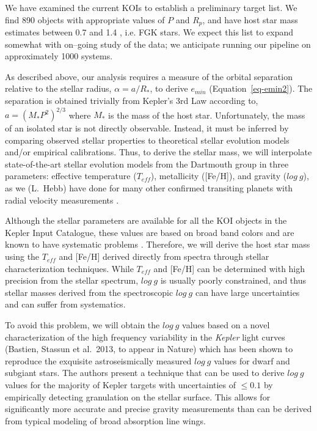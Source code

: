\medskip
{\centerline{}}
\smallskip

We have examined the current KOIs to establish a preliminary target
list.  We find 890 objects with appropriate values of $P$ and $R_p$,
and have host star mass estimates between 0.7 and 1.4 \msun, i.e. FGK
stars.  We expect this list to expand somewhat with on--going study of
the \kepler data; we anticipate running our pipeline on approximately
1000 systems.

As described above, our analysis requires a measure of the orbital
separation relative to the stellar radius, $\alpha = a / R_*$, to
derive $e_{min}$ (Equation~\ref{eq-emin2}).  The separation is
obtained trivially from Kepler's 3rd Law according to, $a = (M_*
P^{2})^{2/3}$ where $M_*$ is the mass of the host star.
Unfortunately, the mass of an isolated star is not directly
observable.  Instead, it must be inferred by comparing observed
stellar properties to theoretical stellar evolution models and/or
empirical calibrations.  Thus, to derive the stellar mass, we will
interpolate state-of-the-art stellar evolution models from the
Dartmouth group \citep{Dotter2008} in three parameters: effective
temperature ($T_{eff}$), metallicity ([Fe/H]), and gravity ($log~g$),
as we (L.~Hebb) have done for many other confirmed transiting planets
with radial velocity measurements \citep[e.g.][]{Hebb2009,Hebb2010}.

Although the stellar parameters are available for all the KOI objects
in the Kepler Input Catalogue, these values are based on broad band
colors and are known to have systematic
problems \citep{Muirhead2012,Pinsonneault2012}.  Therefore, we will
derive the host star mass using the $T_{eff}$ and [Fe/H] derived
directly from spectra through stellar characterization techniques.
While $T_{eff}$ and [Fe/H] can be determined with high precision from
the stellar spectrum, $log~g$ is usually poorly constrained, and thus
stellar masses derived from the spectroscopic $log~g$ can have large
uncertainties and can suffer from systematics.

To avoid this problem, we will obtain the $log~g$ values based on a
novel characterization of the high frequency variability in the {\it
Kepler} light curves (Bastien, Stassun et al.\ 2013, to appear in
Nature) which has been shown to reproduce the exquisite
astroseismically measured $log~g$ values \citep{Huber2013} for dwarf
and subgiant stars.  The authors present a technique that can be used
to derive $log~g$ values for the majority of Kepler targets with
uncertainties of $\le 0.1$ by empirically detecting granulation on the
stellar surface.  This allows for significantly more accurate and
precise gravity measurements than can be derived from typical modeling
of broad absorption line wings.

